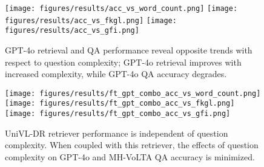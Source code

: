 



\begin{figure*}
\centering
\texttt{[image: figures/results/acc\_vs\_word\_count.png]}\hfill
\texttt{[image: figures/results/acc\_vs\_fkgl.png]}\hfill
\texttt{[image: figures/results/acc\_vs\_gfi.png]}\hfill
    \caption{GPT-4o retrieval and QA performance reveal opposite trends with respect to question complexity; GPT-4o retrieval improves with increased complexity, while GPT-4o QA accuracy degrades.}
    \label{fig:complexity_vs_qa}
\end{figure*}


\begin{figure*}
\centering
\texttt{[image: figures/results/ft\_gpt\_combo\_acc\_vs\_word\_count.png]}\hfill
\texttt{[image: figures/results/ft\_gpt\_combo\_acc\_vs\_fkgl.png]}\hfill
\texttt{[image: figures/results/ft\_gpt\_combo\_acc\_vs\_gfi.png]}\hfill

    \caption{UniVL-DR retriever performance is independent of question complexity. When coupled with this retriever, the effects of question complexity on GPT-4o and MH-VoLTA QA accuracy is minimized.}
    \label{fig:complexity_vs_qa_ft}
    \vspace{-5mm}
\end{figure*}

